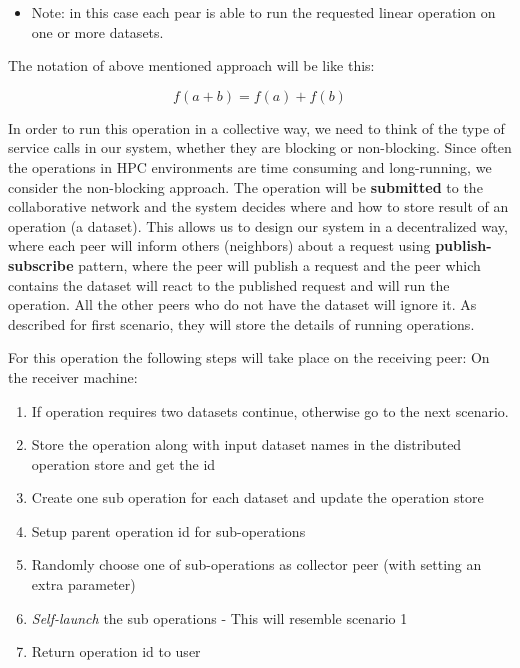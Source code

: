 \begin{itemize}
\item Note: in this case each pear is able to run the requested linear operation on one or more datasets.
\end{itemize}

The notation of above mentioned approach will be like this:

\[ f(a + b) = f(a) + f(b) \]

In order to run this operation in a collective way, 
we need to think of the type of service calls in our system, 
whether they are blocking or non-blocking. 
Since often the operations in HPC environments are time consuming and long-running, 
we consider the non-blocking approach. 
The operation will be \textbf{submitted} to the collaborative network and
the system decides where and how to store result of an operation (a dataset).
This allows us to design our system in a decentralized way, 
where each peer will inform others (neighbors) about a request using \textbf{publish-subscribe} pattern, 
where the peer will publish a request and the peer which contains 
the dataset will react to the published request and will run the operation. 
All the other peers who do not have the dataset will ignore it.
As described for first scenario, 
they will store the details of running operations.


For this operation the following steps will take place on the receiving peer:
On the receiver machine:
\begin{enumerate}
\item If operation requires two datasets continue, otherwise go to the next scenario.
\item Store the operation along with input dataset names in the distributed operation store and get the id
\item Create one sub operation for each dataset and update the operation store
\item Setup parent operation id for sub-operations
\item Randomly choose one of sub-operations as collector peer (with setting an extra parameter)
\item \textit{Self-launch} the sub operations - This will resemble scenario 1
\item Return operation id to user
\end{enumerate}


